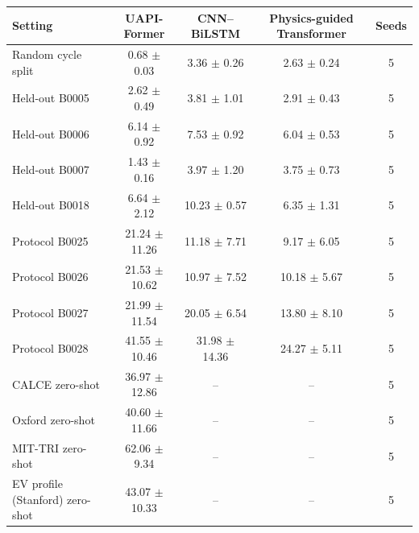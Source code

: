 \begin{tabular}{lcccc}
\toprule
Setting & UAPI-Former & CNN--BiLSTM & Physics-guided Transformer & Seeds \\
\midrule
Random cycle split & 0.68 $\pm$ 0.03 & 3.36 $\pm$ 0.26 & 2.63 $\pm$ 0.24 & 5 \\
\addlinespace
Held-out B0005 & 2.62 $\pm$ 0.49 & 3.81 $\pm$ 1.01 & 2.91 $\pm$ 0.43 & 5 \\
Held-out B0006 & 6.14 $\pm$ 0.92 & 7.53 $\pm$ 0.92 & 6.04 $\pm$ 0.53 & 5 \\
Held-out B0007 & 1.43 $\pm$ 0.16 & 3.97 $\pm$ 1.20 & 3.75 $\pm$ 0.73 & 5 \\
Held-out B0018 & 6.64 $\pm$ 2.12 & 10.23 $\pm$ 0.57 & 6.35 $\pm$ 1.31 & 5 \\
\addlinespace
Protocol B0025 & 21.24 $\pm$ 11.26 & 11.18 $\pm$ 7.71 & 9.17 $\pm$ 6.05 & 5 \\
Protocol B0026 & 21.53 $\pm$ 10.62 & 10.97 $\pm$ 7.52 & 10.18 $\pm$ 5.67 & 5 \\
Protocol B0027 & 21.99 $\pm$ 11.54 & 20.05 $\pm$ 6.54 & 13.80 $\pm$ 8.10 & 5 \\
Protocol B0028 & 41.55 $\pm$ 10.46 & 31.98 $\pm$ 14.36 & 24.27 $\pm$ 5.11 & 5 \\
\addlinespace
CALCE zero-shot & 36.97 $\pm$ 12.86 & -- & -- & 5 \\
Oxford zero-shot & 40.60 $\pm$ 11.66 & -- & -- & 5 \\
MIT-TRI zero-shot & 62.06 $\pm$ 9.34 & -- & -- & 5 \\
\addlinespace
EV profile (Stanford) zero-shot & 43.07 $\pm$ 10.33 & -- & -- & 5 \\
\bottomrule
\end{tabular}
